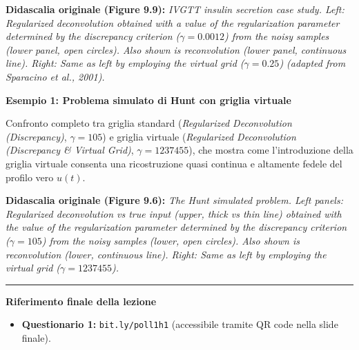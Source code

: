 \noindent\textbf{Didascalia originale (Figure 9.9):} \textit{IVGTT insulin secretion case study. Left: Regularized deconvolution obtained with a value of the regularization parameter determined by the discrepancy criterion ($\gamma = 0.0012$) from the noisy samples (lower panel, open circles). Also shown is reconvolution (lower panel, continuous line). Right: Same as left by employing the virtual grid ($\gamma = 0.25$) (adapted from Sparacino et al., 2001).}

\noindent\textbf{Esempio 1: Problema simulato di Hunt con griglia virtuale}

Confronto completo tra griglia standard (\textit{Regularized Deconvolution (Discrepancy)}, $\gamma = 105$) e griglia virtuale (\textit{Regularized Deconvolution (Discrepancy \& Virtual Grid)}, $\gamma = 1237455$), che mostra come l'introduzione della griglia virtuale consenta una ricostruzione quasi continua e altamente fedele del profilo vero $u(t)$.

\noindent\textbf{Didascalia originale (Figure 9.6):} \textit{The Hunt simulated problem. Left panels: Regularized deconvolution vs true input (upper, thick vs thin line) obtained with the value of the regularization parameter determined by the discrepancy criterion ($\gamma = 105$) from the noisy samples (lower, open circles). Also shown is reconvolution (lower, continuous line). Right: Same as left by employing the virtual grid ($\gamma = 1237455$).}

\vspace{12pt}
\hrule
\vspace{8pt}

\noindent\textbf{Riferimento finale della lezione }
\begin{itemize}
    \item \textbf{Questionario 1:} \texttt{bit.ly/poll1h1} (accessibile tramite QR code nella slide finale).
\end{itemize}